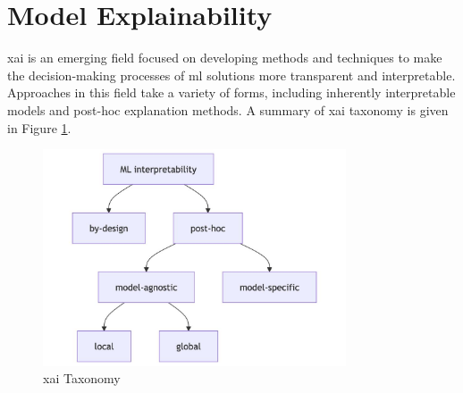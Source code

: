 \section{Model Explainability}

\acrfull{xai} is an emerging field focused on developing methods and techniques to make the decision-making processes of \acrshort{ml} solutions more transparent and interpretable. Approaches in this field take a variety of forms, including inherently interpretable models and post-hoc explanation methods. A summary of \acrshort{xai} taxonomy is given in Figure \ref{fig:xai-taxonomy}.

\begin{figure}[ht]
    \centering
    \includegraphics[width=0.8\textwidth]{../figures/static/xai-taxonomy.jpg}
    \caption{\acrshort{xai} Taxonomy \citep{Molnar2025}}
    \label{fig:xai-taxonomy}
\end{figure}

